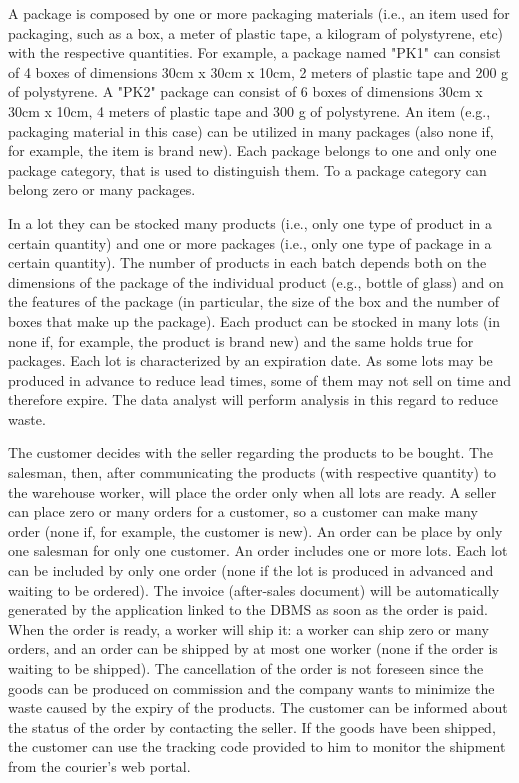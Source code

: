 A package is composed by one or more packaging materials (i.e., an item used for packaging, such as a box, a meter of plastic tape, a kilogram of polystyrene, etc) with the respective quantities. For example, a package named "PK1" can consist of 4 boxes of dimensions 30cm x 30cm x 10cm, 2 meters of plastic tape and 200 g of polystyrene. A "PK2" package can consist of 6 boxes of dimensions 30cm x 30cm x 10cm, 4 meters of plastic tape and 300 g of polystyrene. An item (e.g., packaging material in this case) can be utilized in many packages (also none if, for example, the item is brand new). Each package belongs to one and only one package category, that is used to distinguish them. To a package category can belong zero or many packages.

In a lot they can be stocked many products (i.e., only one type of product in a certain quantity) and one or more packages (i.e., only one type of package in a certain quantity). The number of products in each batch depends both on the dimensions of the package of the individual product (e.g., bottle of glass) and on the features of the package (in particular, the size of the box and the number of boxes that make up the package). Each product can be stocked in many lots (in none if, for example, the product is brand new) and the same holds true for packages. Each lot is characterized by an expiration date. As some lots may be produced in advance to reduce lead times, some of them may not sell on time and therefore expire. The data analyst will perform analysis in this regard to reduce waste.

The customer decides with the seller regarding the products to be bought. The salesman, then, after communicating the products (with respective quantity) to the warehouse worker, will place the order only when all lots are ready. A seller can place zero or many orders for a customer, so a customer can make many order (none if, for example, the customer is new). An order can be place by only one salesman for only one customer. An order includes one or more lots. Each lot can be included by only one order (none if the lot is produced in advanced and waiting to be ordered). The invoice (after-sales document) will be automatically generated by the application linked to the DBMS as soon as the order is paid.
When the order is ready, a worker will ship it: a worker can ship zero or many orders, and an order can be shipped by at most one worker (none if the order is waiting to be shipped). The cancellation of the order is not foreseen since the goods can be produced on commission and the company wants to minimize the waste caused by the expiry of the products. The customer can be informed about the status of the order by contacting the seller. If the goods have been shipped, the customer can use the tracking code provided to him to monitor the shipment from the courier's web portal.
